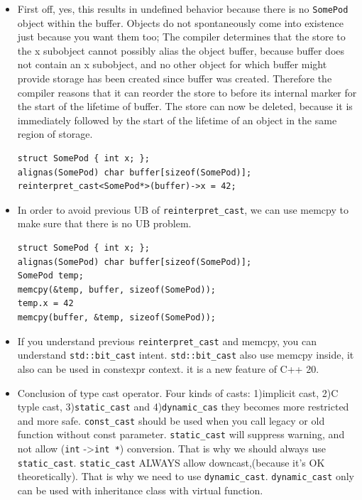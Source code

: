 \documentclass[a4paper,11pt,twoside]{book}
\begin{document}
\begin{itemize}
	\item First off, yes, this results in undefined behavior because there is no \texttt{SomePod} object within the buffer. Objects do not spontaneously come into existence just because you want them too; The compiler determines that the store to the x subobject cannot possibly alias the object buffer, because buffer does not contain an x subobject, and no other object for which buffer might provide storage has been created since buffer was created. Therefore the compiler reasons that it can reorder the store to before its internal marker for the start of the lifetime of buffer. The store can now be deleted, because it is immediately followed by the start of the lifetime of an object in the same region of storage.
\begin{lstlisting}
struct SomePod { int x; };
alignas(SomePod) char buffer[sizeof(SomePod)];
reinterpret_cast<SomePod*>(buffer)->x = 42;
\end{lstlisting}

	\item In order to avoid previous UB of \texttt{reinterpret\_cast}, we can use memcpy to make sure that there is no UB problem. 
\begin{lstlisting}
struct SomePod { int x; };
alignas(SomePod) char buffer[sizeof(SomePod)];
SomePod temp;
memcpy(&temp, buffer, sizeof(SomePod));
temp.x = 42
memcpy(buffer, &temp, sizeof(SomePod));	
\end{lstlisting}

	
	\item If you understand previous \texttt{reinterpret\_cast} and memcpy, you can understand \texttt{std::bit\_cast} intent. \texttt{std::bit\_cast} also use memcpy inside, it also can be used in constexpr context.  it is a new feature of C++ 20.
	
	\item Conclusion of type cast operator. Four kinds of casts: 1)implicit cast, 2)C typle cast, 3)\texttt{static\_cast} and 4)\texttt{dynamic\_cas} they becomes more restricted and more safe. \texttt{const\_cast} should be used when you call legacy or old function without const parameter. \texttt{static\_cast} will suppress warning, and not allow (\texttt{int} ->\texttt{int *}) conversion. That is why we should always use \texttt{static\_cast}. \texttt{static\_cast} ALWAYS allow downcast,(because it's OK theoretically). That is why we need to use \texttt{dynamic\_cast}. \texttt{dynamic\_cast} only can be used with inheritance class with virtual function. 
	
\end{itemize}
\end{document}

